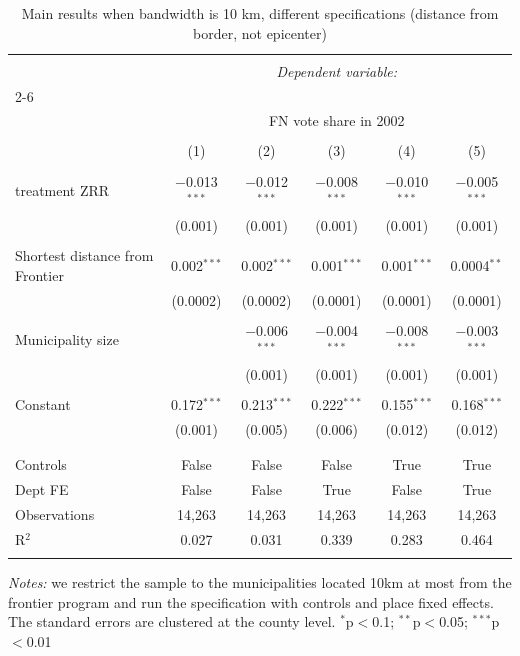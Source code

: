 \begin{appendices}
\begin{table}[!htbp]
\caption{Main results when bandwidth is 10 km, different specifications (distance from border, not epicenter)} 
\label{tab:rdd_results_10-noEpi}
\centering
\footnotesize
\begin{tabular}{@{\extracolsep{3pt}}lccccc} 
\\[-1.8ex]\hline 
\hline \\[-1.8ex] 
 & \multicolumn{5}{c}{\textit{Dependent variable:}} \\ 
\cline{2-6} 
\\[-1.8ex] & \multicolumn{5}{c}{FN vote share in 2002} \\ 
\\[-1.8ex] & (1) & (2) & (3) & (4) & (5)\\ 
\hline \\[-1.8ex] 
 treatment ZRR & $-$0.013$^{***}$ & $-$0.012$^{***}$ & $-$0.008$^{***}$ & $-$0.010$^{***}$ & $-$0.005$^{***}$ \\ 
  & (0.001) & (0.001) & (0.001) & (0.001) & (0.001) \\ 
  & & & & & \\ 
 Shortest distance from Frontier & 0.002$^{***}$ & 0.002$^{***}$ & 0.001$^{***}$ & 0.001$^{***}$ & 0.0004$^{**}$ \\ 
  & (0.0002) & (0.0002) & (0.0001) & (0.0001) & (0.0001) \\ 
  & & & & & \\ 
 Municipality size &  & $-$0.006$^{***}$ & $-$0.004$^{***}$ & $-$0.008$^{***}$ & $-$0.003$^{***}$ \\ 
  &  & (0.001) & (0.001) & (0.001) & (0.001) \\ 
  & & & & & \\ 
 Constant & 0.172$^{***}$ & 0.213$^{***}$ & 0.222$^{***}$ & 0.155$^{***}$ & 0.168$^{***}$ \\ 
  & (0.001) & (0.005) & (0.006) & (0.012) & (0.012) \\ 
  & & & & & \\ 
\hline \\[-1.8ex] 
Controls & False & False & False & True & True \\ 
Dept FE & False & False & True & False & True \\ 
Observations & 14,263 & 14,263 & 14,263 & 14,263 & 14,263 \\ 
R$^{2}$ & 0.027 & 0.031 & 0.339 & 0.283 & 0.464 \\ 
\hline 
\hline \\[-1.8ex] 
\end{tabular} 
\parbox{\textwidth}{\footnotesize \textit{Notes:} we restrict the sample to the municipalities located 10km at most from the frontier program and run the specification with controls and place fixed effects. The standard errors are clustered at the county level. $^{*}$p$<$0.1; $^{**}$p$<$0.05; $^{***}$p$<$0.01}
\end{table}




\end{appendices}
